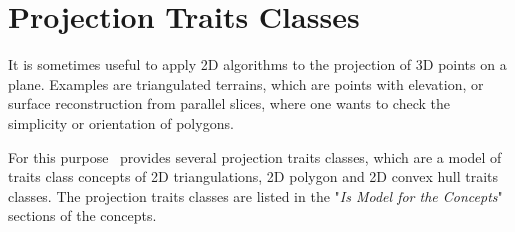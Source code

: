 \section{Projection Traits Classes \label{section-projection-traits}}

It is sometimes useful to apply 2D algorithms to the projection of 3D points on
a plane. Examples are
triangulated terrains, which are points with elevation, or surface 
reconstruction from parallel slices, where one wants to check the simplicity
or orientation of polygons.

For this purpose \cgal\ provides several projection traits classes,
which are a model of traits class concepts of 2D triangulations,
2D polygon and 2D convex hull traits classes.  The projection traits classes 
are listed in the "{\em Is Model for the Concepts}" sections of the concepts. 
